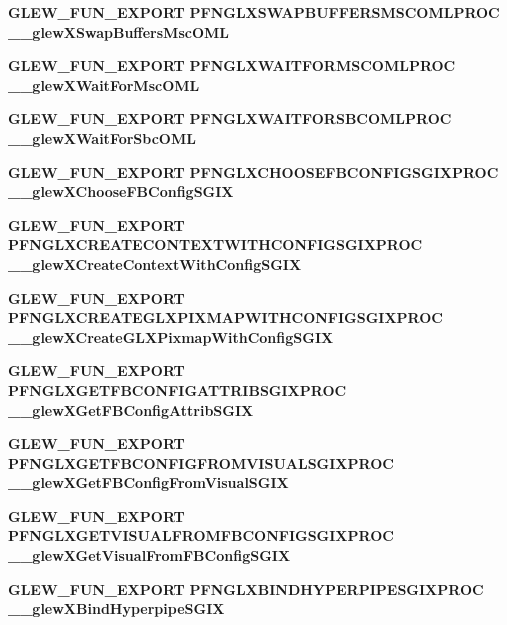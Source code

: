 \begin{DoxyCompactItemize}
\item 
{\bf G\+L\+E\+W\+\_\+\+F\+U\+N\+\_\+\+E\+X\+P\+O\+RT} {\bf P\+F\+N\+G\+L\+X\+S\+W\+A\+P\+B\+U\+F\+F\+E\+R\+S\+M\+S\+C\+O\+M\+L\+P\+R\+OC} {\bf \+\_\+\+\_\+glew\+X\+Swap\+Buffers\+Msc\+O\+ML}
\item 
{\bf G\+L\+E\+W\+\_\+\+F\+U\+N\+\_\+\+E\+X\+P\+O\+RT} {\bf P\+F\+N\+G\+L\+X\+W\+A\+I\+T\+F\+O\+R\+M\+S\+C\+O\+M\+L\+P\+R\+OC} {\bf \+\_\+\+\_\+glew\+X\+Wait\+For\+Msc\+O\+ML}
\item 
{\bf G\+L\+E\+W\+\_\+\+F\+U\+N\+\_\+\+E\+X\+P\+O\+RT} {\bf P\+F\+N\+G\+L\+X\+W\+A\+I\+T\+F\+O\+R\+S\+B\+C\+O\+M\+L\+P\+R\+OC} {\bf \+\_\+\+\_\+glew\+X\+Wait\+For\+Sbc\+O\+ML}
\item 
{\bf G\+L\+E\+W\+\_\+\+F\+U\+N\+\_\+\+E\+X\+P\+O\+RT} {\bf P\+F\+N\+G\+L\+X\+C\+H\+O\+O\+S\+E\+F\+B\+C\+O\+N\+F\+I\+G\+S\+G\+I\+X\+P\+R\+OC} {\bf \+\_\+\+\_\+glew\+X\+Choose\+F\+B\+Config\+S\+G\+IX}
\item 
{\bf G\+L\+E\+W\+\_\+\+F\+U\+N\+\_\+\+E\+X\+P\+O\+RT} {\bf P\+F\+N\+G\+L\+X\+C\+R\+E\+A\+T\+E\+C\+O\+N\+T\+E\+X\+T\+W\+I\+T\+H\+C\+O\+N\+F\+I\+G\+S\+G\+I\+X\+P\+R\+OC} {\bf \+\_\+\+\_\+glew\+X\+Create\+Context\+With\+Config\+S\+G\+IX}
\item 
{\bf G\+L\+E\+W\+\_\+\+F\+U\+N\+\_\+\+E\+X\+P\+O\+RT} {\bf P\+F\+N\+G\+L\+X\+C\+R\+E\+A\+T\+E\+G\+L\+X\+P\+I\+X\+M\+A\+P\+W\+I\+T\+H\+C\+O\+N\+F\+I\+G\+S\+G\+I\+X\+P\+R\+OC} {\bf \+\_\+\+\_\+glew\+X\+Create\+G\+L\+X\+Pixmap\+With\+Config\+S\+G\+IX}
\item 
{\bf G\+L\+E\+W\+\_\+\+F\+U\+N\+\_\+\+E\+X\+P\+O\+RT} {\bf P\+F\+N\+G\+L\+X\+G\+E\+T\+F\+B\+C\+O\+N\+F\+I\+G\+A\+T\+T\+R\+I\+B\+S\+G\+I\+X\+P\+R\+OC} {\bf \+\_\+\+\_\+glew\+X\+Get\+F\+B\+Config\+Attrib\+S\+G\+IX}
\item 
{\bf G\+L\+E\+W\+\_\+\+F\+U\+N\+\_\+\+E\+X\+P\+O\+RT} {\bf P\+F\+N\+G\+L\+X\+G\+E\+T\+F\+B\+C\+O\+N\+F\+I\+G\+F\+R\+O\+M\+V\+I\+S\+U\+A\+L\+S\+G\+I\+X\+P\+R\+OC} {\bf \+\_\+\+\_\+glew\+X\+Get\+F\+B\+Config\+From\+Visual\+S\+G\+IX}
\item 
{\bf G\+L\+E\+W\+\_\+\+F\+U\+N\+\_\+\+E\+X\+P\+O\+RT} {\bf P\+F\+N\+G\+L\+X\+G\+E\+T\+V\+I\+S\+U\+A\+L\+F\+R\+O\+M\+F\+B\+C\+O\+N\+F\+I\+G\+S\+G\+I\+X\+P\+R\+OC} {\bf \+\_\+\+\_\+glew\+X\+Get\+Visual\+From\+F\+B\+Config\+S\+G\+IX}
\item 
{\bf G\+L\+E\+W\+\_\+\+F\+U\+N\+\_\+\+E\+X\+P\+O\+RT} {\bf P\+F\+N\+G\+L\+X\+B\+I\+N\+D\+H\+Y\+P\+E\+R\+P\+I\+P\+E\+S\+G\+I\+X\+P\+R\+OC} {\bf \+\_\+\+\_\+glew\+X\+Bind\+Hyperpipe\+S\+G\+IX}
\item 

\end{DoxyCompactItemize}
